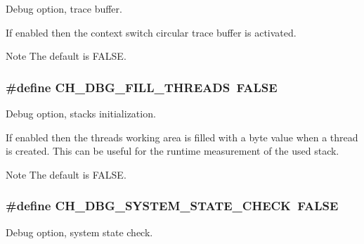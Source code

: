 Debug option, trace buffer. 

If enabled then the context switch circular trace buffer is activated.

\begin{DoxyNote}{Note}
The default is {\ttfamily F\+A\+L\+S\+E}. 
\end{DoxyNote}
\hypertarget{group__config_ga6a859dd249adfb66b9bbf809061ea06c}{}
\subsubsection[{C\+H\+\_\+\+D\+B\+G\+\_\+\+F\+I\+L\+L\+\_\+\+T\+H\+R\+E\+A\+D\+S}]{\setlength{\rightskip}{0pt plus 5cm}\#define C\+H\+\_\+\+D\+B\+G\+\_\+\+F\+I\+L\+L\+\_\+\+T\+H\+R\+E\+A\+D\+S~F\+A\+L\+S\+E}\label{group__config_ga6a859dd249adfb66b9bbf809061ea06c}


Debug option, stacks initialization. 

If enabled then the threads working area is filled with a byte value when a thread is created. This can be useful for the runtime measurement of the used stack.

\begin{DoxyNote}{Note}
The default is {\ttfamily F\+A\+L\+S\+E}. 
\end{DoxyNote}
\hypertarget{group__config_ga10db71bc25605169dddc82c1604b0a16}{}
\subsubsection[{C\+H\+\_\+\+D\+B\+G\+\_\+\+S\+Y\+S\+T\+E\+M\+\_\+\+S\+T\+A\+T\+E\+\_\+\+C\+H\+E\+C\+K}]{\setlength{\rightskip}{0pt plus 5cm}\#define C\+H\+\_\+\+D\+B\+G\+\_\+\+S\+Y\+S\+T\+E\+M\+\_\+\+S\+T\+A\+T\+E\+\_\+\+C\+H\+E\+C\+K~F\+A\+L\+S\+E}\label{group__config_ga10db71bc25605169dddc82c1604b0a16}


Debug option, system state check. 

